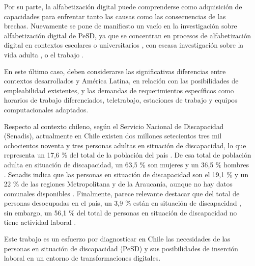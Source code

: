 Por su parte, la alfabetización digital puede comprenderse como
adquisición de capacidades para enfrentar tanto las causas como las
consecuencias de las brechas. Nuevamente se pone de manifiesto un vacío
en la investigación sobre alfabetización digital de PeSD, ya que se
concentran en procesos de alfabetización digital en contextos escolares
o universitarios \cite{IBRAIMKULOV2022}, con escasa
investigación sobre la vida adulta \cite{BARLOTT2021}, o el
trabajo \cite{GUPTA2021}.

En este último caso, deben considerarse las significativas diferencias
entre contextos desarrollados y América Latina, en relación con las
posibilidades de empleabilidad existentes, y las demandas de
requerimientos específicos como horarios de trabajo diferenciados,
teletrabajo, estaciones de trabajo y equipos computacionales adaptados.

Respecto al contexto chileno, según el Servicio Nacional de Discapacidad
(Senadis), actualmente en Chile existen dos millones setecientos tres
mil ochocientos noventa y tres personas adultas en situación de
discapacidad, lo que representa un 17,6 \% del total de la población del
país \cite[p. 14]{SENADIS2022}. De esa total de población adulta en
situación de discapacidad, un 63,5 \% son mujeres y un 36,5 \% hombres
\cite[p. 18]{SENADIS2022}. Senadis indica que las personas en situación de discapacidad son el 19,1 \% y un 22 \% de las regiones Metropolitana y de la Araucanía, aunque no hay datos comunales disponibles \cite[p. 30]{SENADIS2022}. Finalmente, parece relevante destacar que del total de personas desocupadas en el país, un 3,9 \% están en situación de discapacidad \cite[p. 52]{SENADIS2022}, sin embargo, un 56,1 \% del total de personas en situación de discapacidad no tiene actividad laboral \cite[p. 58]{SENADIS2022}.

Este trabajo es un esfuerzo por diagnosticar en Chile las necesidades de
las personas en situación de discapacidad (PeSD) y sus posibilidades de
inserción laboral en un entorno de transformaciones digitales.